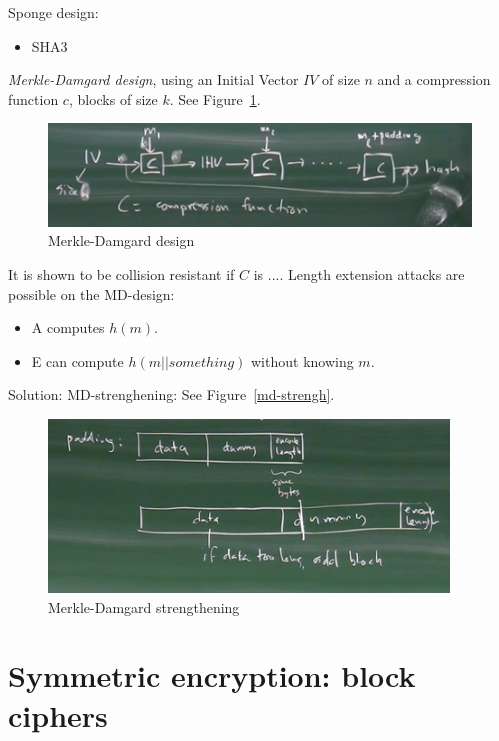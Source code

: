 \documentclass[language=english,number=]{homework}
\begin{document}
    Sponge design:
    \begin{itemize}
        \item SHA3
    \end{itemize}

    \textit{Merkle-Damgard design}, using an Initial Vector $IV$ of size $n$ and a compression function $c$, blocks of size $k$.
See Figure~\ref{md}.

\begin{figure}
    \centering
    \includegraphics[width=\textwidth]{merkle-damgard.PNG}
    \caption{Merkle-Damgard design}
    \label{md}
\end{figure}

    It is shown to be collision resistant if $C$ is ....
    Length extension attacks are possible on the MD-design:
    \begin{itemize}
        \item A computes $h(m)$.
        \item E can compute $h(m||something)$ without knowing $m$.
    \end{itemize}

    Solution: MD-strenghening:
    See Figure~\ref{md-strengh}.

    \begin{figure}
        \centering
        \includegraphics[width=\textwidth]{md-strength.PNG}
        \caption{Merkle-Damgard strengthening}
        \label{md-strength}
    \end{figure}

    \newpage
    \section{Symmetric encryption: block ciphers}
\end{document}
